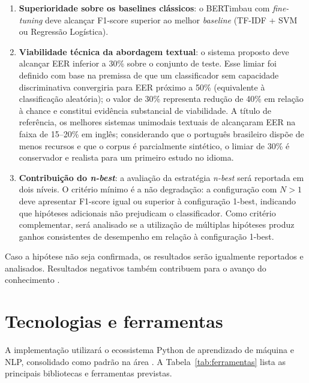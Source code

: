 \documentclass[
    12pt,                %
    openright,           %
    oneside,             %
    a4paper,             %
    english,             %
    brazil               %
]{abntex2}
\begin{document}
\begin{enumerate}
    \item \textbf{Superioridade sobre os baselines clássicos}: o BERTimbau com \textit{fine-tuning} deve alcançar F1-score superior ao melhor \textit{baseline} (TF-IDF + SVM ou Regressão Logística).

    \item \textbf{Viabilidade técnica da abordagem textual}: o sistema proposto deve alcançar EER inferior a 30\% sobre o conjunto de teste. Esse limiar foi definido com base na premissa de que um classificador sem capacidade discriminativa convergiria para EER próximo a 50\% (equivalente à classificação aleatória); o valor de 30\% representa redução de 40\% em relação à chance e constitui evidência substancial de viabilidade. A título de referência, os melhores sistemas unimodais textuais de  alcançaram EER na faixa de 15--20\% em inglês; considerando que o português brasileiro dispõe de menos recursos e que o corpus é parcialmente sintético, o limiar de 30\% é conservador e realista para um primeiro estudo no idioma.

    \item \textbf{Contribuição do \textit{n-best}}: a avaliação da estratégia \textit{n-best} será reportada em dois níveis. O critério mínimo é a não degradação: a configuração com $N > 1$ deve apresentar F1-score igual ou superior à configuração 1-best, indicando que hipóteses adicionais não prejudicam o classificador. Como critério complementar, será analisado se a utilização de múltiplas hipóteses produz ganhos consistentes de desempenho em relação à configuração 1-best.
\end{enumerate}

Caso a hipótese não seja confirmada, os resultados serão igualmente reportados e analisados. Resultados negativos também contribuem para o avanço do conhecimento \cite{Wazlawick2020}.

\section{Tecnologias e ferramentas}
\label{sec:tecnologias}

A implementação utilizará o ecossistema Python de aprendizado de máquina e NLP, consolidado como padrão na área \cite{Weld2022}. A Tabela~\ref{tab:ferramentas} lista as principais bibliotecas e ferramentas previstas.
\end{document}
